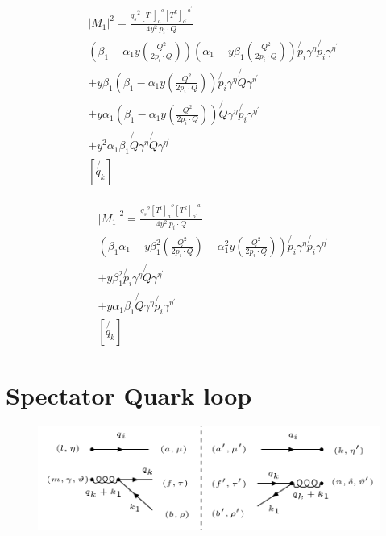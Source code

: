 \begin{equation}
\begin{split}
&|M_1|^2=\frac{{g_s}^2 {[T^l]_a}^o {[T^k]_{o^{\prime}}}^{a^{\prime}}}{4y^2\:p_i\cdot Q}\\
&(\beta_1 -\alpha_1 y(\frac{Q^2}{2p_i \cdot Q}))(\alpha_1 -y\beta_1(\frac{Q^2}{2p_i \cdot Q}))\not{p_i}{\gamma}^{\eta}\not{p_i}{\gamma}^{{\eta}^{\prime}}\\
&+y\beta_1(\beta_1 -\alpha_1 y(\frac{Q^2}{2p_i \cdot Q}))\not{p_i}{\gamma}^{\eta}\not{Q}{\gamma}^{{\eta}^{\prime}}\\
&+y\alpha_1(\beta_1 -\alpha_1 y(\frac{Q^2}{2p_i \cdot Q}))\not{Q}{\gamma}^{\eta}\not{p_i}{\gamma}^{{\eta}^{\prime}}\\
&+ y^2\alpha_1\beta_1\not{Q}{\gamma}^{\eta} \not{Q}{\gamma}^{{\eta}^{\prime}}\\
&[\not{q_k}]
\end{split}
\end{equation}

\begin{equation}
\begin{split}
&|M_1|^2=\frac{{g_s}^2 {[T^l]_a}^o {[T^k]_{o^{\prime}}}^{a^{\prime}}}{4y^2\:p_i\cdot Q}\\
&(\beta_1\alpha_1-y\beta_1^2(\frac{Q^2}{2p_i \cdot Q}) -\alpha_1^2 y(\frac{Q^2}{2p_i \cdot Q}))\not{p_i}{\gamma}^{\eta}\not{p_i}{\gamma}^{{\eta}^{\prime}}\\
&+y\beta_1^2 \not{p_i}{\gamma}^{\eta}\not{Q}{\gamma}^{{\eta}^{\prime}}\\
&+y\alpha_1\beta_1 \not{Q}{\gamma}^{\eta}\not{p_i}{\gamma}^{{\eta}^{\prime}}\\
&[\not{q_k}]
\end{split}
\end{equation}

\pagebreak

\section{Spectator Quark loop}
\begin{figure}[ht!]
\centering
\includegraphics[scale=0.7]{images/QG/M2Squer.png}
\end{figure}

